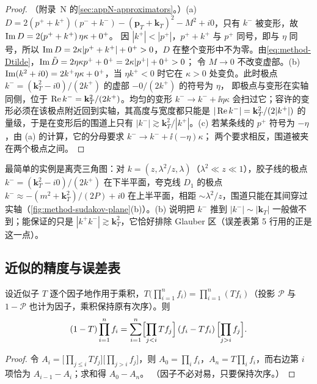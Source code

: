 \begin{proof}
（附录~N 的\cref{sec:appN-approximators}。）(a) $D=2(p^++k^+)(p^-+k^-)-(\mathbf p_T+\mathbf k_T)^2-M^2+i0$，只有 $k^-$ 被变形，故 $\operatorname{Im} D=2(p^++k^+)\,\eta\kappa+0^+$。
因 $|k^+|<|p^+|$，$p^++k^+$ 与 $p^+$ 同号，即与 $\eta$ 同号，所以 $\operatorname{Im} D=2\kappa|p^++k^+|+0^+>0$，$D$ 在整个变形中不为零。由\cref{eq:method-Dtilde}，$\operatorname{Im}\tilde D=2\eta\kappa p^++0^+=2\kappa|p^+|+0^+>0$；
令 $M\to0$ 不改变虚部。(b) $\operatorname{Im}(k^2+i0)=2k^+\eta\kappa+0^+$，当 $\eta k^+<0$ 时它在 $\kappa>0$ 处变负。此时极点 $k^-=(\mathbf k_T^2-i0)/(2k^+)$ 的虚部 $-0/(2k^+)$ 的符号为 $\eta$，
即极点与变形在实轴同侧，位于 $\operatorname{Re} k^-=\mathbf k_T^2/(2k^+)$。均匀的变形 $k^-\to k^-+\ii\eta\kappa$ 会扫过它；容许的变形必须在该极点附近回到实轴，其高度与宽度都只能是
$|\operatorname{Re} k^-|=\mathbf k_T^2/(2|k^+|)$ 的量级，于是在变形后的围道上只有 $|k^-|\gtrsim\mathbf k_T^2/|k^+|$。(c) 若某条线的 $p^+$ 符号为 $-\eta$，由 (a) 的计算，它的分母要求 $k^-\to k^-+\ii(-\eta)\kappa$；
两个要求相反，围道被夹在两个极点之间。
\end{proof}

最简单的实例是离壳三角图：对 $k=(z,\lambda^2/z,\lambda)$（$\lambda^2\ll z\ll1$），胶子线的极点 $k^-=(\mathbf k_T^2-i0)/(2k^+)$ 在下半平面，夸克线 $D_1$ 的极点 $k^-\approx-(m^2+\mathbf k_T^2)/(2P)+i0$
在上半平面，相距 $\sim\lambda^2/z$，围道只能在其间穿过实轴（\cref{fig:method-sudakov-plane}(b)）。(b) 说明把 $k^-$ 推到 $|k^-|\sim|\mathbf k_T|$ 一般做不到；能保证的只是
$|k^+k^-|\gtrsim\mathbf k_T^2$，它恰好排除 Glauber 区（误差表第 5 行用的正是这一点）。

\subsection{近似的精度与误差表}

\begin{lemma}[乘积的伸缩恒等式]\label{lem:method-telescoping}
设近似子 $T$ 逐个因子地作用于乘积，$T\bigl(\prod_{i=1}^nf_i\bigr)=\prod_{i=1}^n(Tf_i)$（投影 $\mathcal P$ 与 $1-\mathcal P$ 也计为因子，乘积保持原有次序）。则
\begin{equation}\label{eq:method-telescoping}
(1-T)\prod_{i=1}^nf_i=\sum_{i=1}^n\Bigl[\prod_{j<i}Tf_j\Bigr]\,(f_i-Tf_i)\,\Bigl[\prod_{j>i}f_j\Bigr].
\end{equation}
\end{lemma}

\begin{proof}
令 $A_i=\bigl[\prod_{j\le i}Tf_j\bigr]\bigl[\prod_{j>i}f_j\bigr]$，则 $A_0=\prod_if_i$，$A_n=T\prod_if_i$，而右边第 $i$ 项恰为 $A_{i-1}-A_i$；求和得 $A_0-A_n$。
（因子不必对易，只要保持次序。）
\end{proof}

